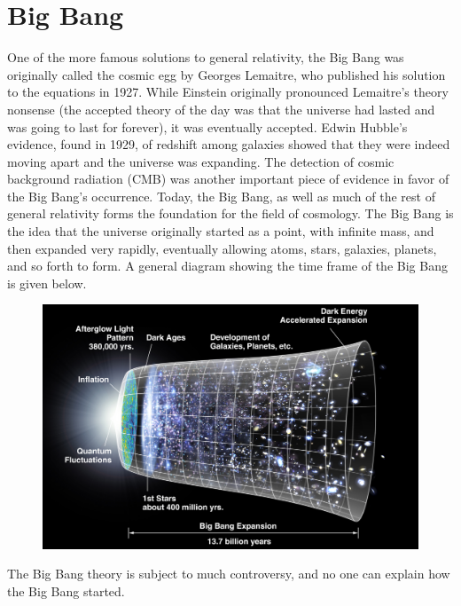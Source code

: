 \section{Big Bang}
One of the more famous solutions to general relativity, the Big Bang was originally called the cosmic egg by Georges Lemaitre, who published 
his solution to the equations in 1927. While Einstein originally pronounced Lemaitre's theory nonsense (the accepted theory of the day 
was that the universe had lasted and was going to last for forever), it was eventually accepted. Edwin Hubble's evidence, found in 1929,
of redshift among galaxies showed that they were indeed moving apart and the universe was expanding. The detection of cosmic background radiation (CMB) 
was another important piece of evidence in favor of the Big Bang's occurrence. Today, the Big Bang, as well as much of the 
rest of general relativity forms the foundation for the field of cosmology. The Big Bang is the idea that the universe originally started
as a point, with infinite mass, and then expanded very rapidly, eventually allowing atoms, stars, galaxies, planets, and so forth to form.
A general diagram showing the time frame of the Big Bang is given below.
\begin{figure}[H]
\includegraphics[scale=0.5]{bigbang.jpg}
\end{figure}
The Big Bang theory is subject to much controversy, and no one can explain how the Big Bang started. 
